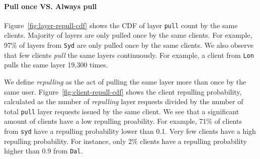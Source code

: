 \paragraph{Pull once VS. Always pull}
Figure~\ref{fig:layer-repull-cdf} shows the CDF of layer \texttt{pull} count by the same clients. 
Majority of layers are only pulled once by the same clients.
For example, 97\% of layers from \texttt{Syd} are only pulled once by the same clients.
We also observe that few clients \emph{pull} the same layers continuously.
For example, a client from \texttt{Lon} pulls the same layer 19,300 times.

We define \emph{repulling} as the act of pulling the same layer more than once by the same user.
Figure~\ref{fig:client-repull-cdf} shows the client repulling probability, calculated as the number of \emph{repulling} layer requests divided by
the number of total \texttt{pull} layer requests issued by the same client.
We see that a significant amount of clients have a low repulling proability.
For example,
71\% of clients from \texttt{syd} have a repulling probability lower than 0.1.
Very few clients have a high repulling probability.
For instance,
only 2\% clients have a repulling probability higher than 0.9 from 
\texttt{Dal}.

